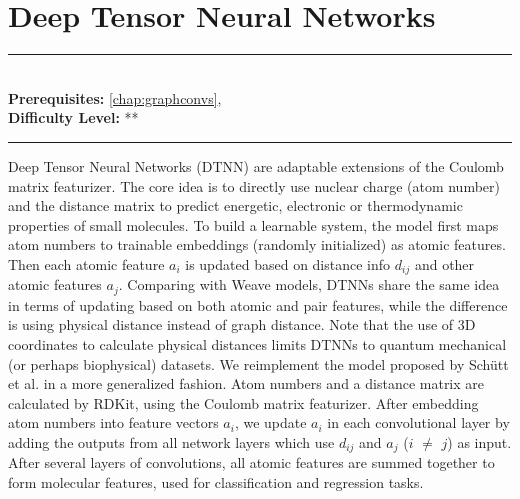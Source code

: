 \documentclass[book.tex]{subfiles}
\begin{document}
\chapter{Deep Tensor Neural Networks}
\label{chap:dtnn}
\noindent\rule{11cm}{0.4pt} \\
\textbf{Prerequisites:} \autoref{chap:graphconvs}, \\
\textbf{Difficulty Level:} ** \\
\noindent\rule{11cm}{0.4pt}
\vspace{5mm}

Deep Tensor Neural Networks (DTNN) are adaptable extensions of the Coulomb matrix featurizer.\cite{schutt2017quantum} The core idea is to directly use nuclear charge (atom number) and the distance matrix to predict energetic, electronic or thermodynamic properties of small molecules. To build a learnable system, the model first maps atom numbers to trainable embeddings (randomly initialized) as atomic features. Then each atomic feature $a_i$ is updated
based on distance info $d_{ij}$ and other atomic features $a_j$.
Comparing with Weave models, DTNNs share the same idea in terms of updating based on both atomic and pair features, while the difference is using physical distance instead of graph distance. Note that the use of 3D coordinates to calculate physical distances limits DTNNs to quantum mechanical (or perhaps biophysical) datasets. We reimplement the model proposed by Sch{\"u}tt et al.\cite{schutt2017quantum} in a more generalized fashion. Atom numbers and a distance matrix are calculated by RDKit,\cite{landrum2006rdkit} using the Coulomb matrix featurizer. After embedding atom numbers into feature vectors $a_i$, we update $a_i$ in each convolutional layer by adding the
outputs from all network layers which use $d_{ij}$ and $a_j$ ($i$ $\neq$ $j$) as
input. After several layers of convolutions, all atomic features are summed together to form molecular features, used for classification and regression tasks.
\end{document}
